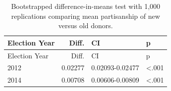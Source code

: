 \documentclass[10pt,]{article}
\begin{document}
\begin{longtable}[]{@{}lrll@{}}
\caption{Bootstrapped difference-in-means test with 1,000 replications
comparing mean partisanship of new versus old donors.}\tabularnewline
\toprule
Election Year & Diff. & CI & p\tabularnewline
\midrule
\endfirsthead
\toprule
Election Year & Diff. & CI & p\tabularnewline
\midrule
\endhead
2012 & 0.02277 & 0.02093-0.02477 & \textless.001\tabularnewline
2014 & 0.00708 & 0.00606-0.00809 & \textless.001\tabularnewline
\bottomrule
\end{longtable}





\newpage
\singlespacing 
\end{document}
